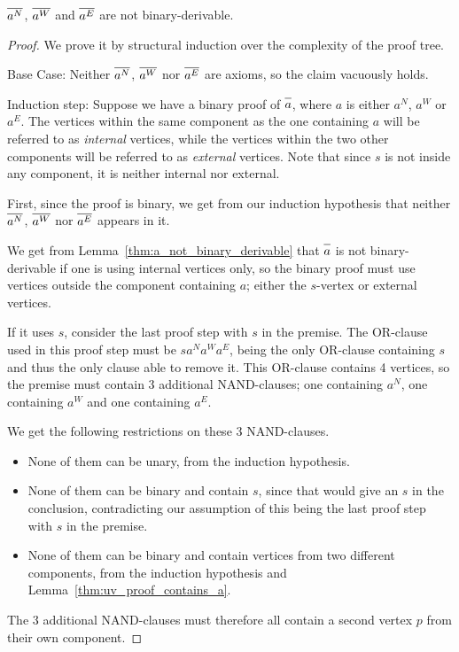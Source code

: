 \begin{lemma}
  $\ol{a^N}$, $\ol{a^W}$ and $\ol{a^E}$ are not binary-derivable.
  \label{thm:non_binary_derivable_a}
\end{lemma}
\begin{proof}
  We prove it by structural induction over the complexity of the proof tree.

  Base Case:
  Neither $\ol{a^N}$, $\ol{a^W}$ nor $\ol{a^E}$ are axioms, so the claim vacuously holds.

  Induction step:
  Suppose we have a binary proof of $\ol{a}$, where $a$ is either $a^N$, $a^W$ or $a^E$.
  The vertices within the same component as the one containing $a$ will be referred to as \textit{internal} vertices, while the vertices within the two other components will be referred to as \textit{external} vertices.
  Note that since $s$ is not inside any component, it is neither internal nor external.

  First, since the proof is binary, we get from our induction hypothesis that neither $\ol{a^N}$, $\ol{a^W}$ nor $\ol{a^E}$ appears in it.

  We get from Lemma~\ref{thm:a_not_binary_derivable} that $\ol{a}$ is not binary-derivable if one is using internal vertices only, so the binary proof must use vertices outside the component containing $a$; either the $s$-vertex or external vertices.

  If it uses $s$, consider the last proof step with $s$ in the premise.
  The OR-clause used in this proof step must be $sa^Na^Wa^E$, being the only OR-clause containing $s$ and thus the only clause able to remove it.
  This OR-clause contains 4 vertices, so the premise must contain 3 additional NAND-clauses;
  one containing $a^N$, one containing $a^W$ and one containing $a^E$.

  We get the following restrictions on these 3 NAND-clauses.
  \begin{itemize}
    \item None of them can be unary, from the induction hypothesis.
    \item None of them can be binary and contain $s$, since that would give an $s$ in the conclusion, contradicting our assumption of this being the last proof step with $s$ in the premise.
    \item None of them can be binary and contain vertices from two different components, from the induction hypothesis and Lemma~\ref{thm:uv_proof_contains_a}.
  \end{itemize}
  The 3 additional NAND-clauses must therefore all contain a second vertex $p$ from their own component.


\end{proof}
